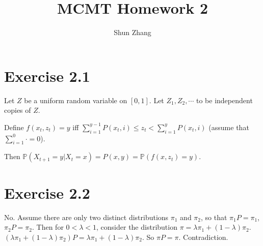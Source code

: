 \documentclass[10pt]{article}
\title{MCMT Homework 2}
\author{Shun Zhang}
\date{}
\renewcommand{\P}{\mathbb{P}}
\begin{document}
\maketitle

\section*{Exercise 2.1}

Let $Z$ be a uniform random variable on $[0, 1]$. Let $Z_1, Z_2, \cdots$ to be
independent copies of $Z$.

Define $f(x_t, z_t) = y$ iff $\sum_{i=1}^{y-1} P(x_t, i) \leq z_t <
\sum_{i=1}^{y} P(x_t, i)$ (assume that $\sum_{i=1}^0 \cdot = 0$).

Then $\P(X_{t+1} = y | X_t = x) = P(x, y) = \P(f(x, z_t) = y)$.

\section*{Exercise 2.2}

No. Assume there are only two distinct distributions $\pi_1$ and $\pi_2$, so
that $\pi_1 P = \pi_1$, $\pi_2 P = \pi_2$. Then for $0 < \lambda < 1$, consider
the distribution $\pi = \lambda \pi_1 + (1 - \lambda) \pi_2$. $(\lambda \pi_1 +
(1 - \lambda) \pi_2) P = \lambda \pi_1 + (1 - \lambda) \pi_2$. So $\pi P = \pi$.
Contradiction.
\end{document}
